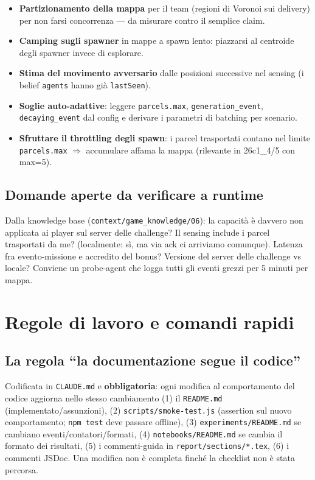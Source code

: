 \documentclass[11pt,a4paper]{article}
\newcommand{\file}[1]{\texttt{#1}}
\newcommand{\code}[1]{\texttt{#1}}
\begin{document}
\begin{itemize}
  \item \textbf{Partizionamento della mappa} per il team (regioni di
    Voronoi sui delivery) per non farsi concorrenza — da misurare contro
    il semplice claim.
  \item \textbf{Camping sugli spawner} in mappe a spawn lento: piazzarsi
    al centroide degli spawner invece di esplorare.
  \item \textbf{Stima del movimento avversario} dalle posizioni
    successive nel sensing (i belief \code{agents} hanno già
    \code{lastSeen}).
  \item \textbf{Soglie auto-adattive}: leggere \code{parcels.max},
    \code{generation\_event}, \code{decaying\_event} dal config e derivare
    i parametri di batching per scenario.
  \item \textbf{Sfruttare il throttling degli spawn}: i parcel trasportati
    contano nel limite \code{parcels.max} $\Rightarrow$ accumulare affama
    la mappa (rilevante in 26c1\_4/5 con max=5).
\end{itemize}

\subsection{Domande aperte da verificare a runtime}

Dalla knowledge base (\file{context/game\_knowledge/06}): la capacità è
davvero non applicata ai player sul server delle challenge? Il sensing
include i parcel trasportati da me? (localmente: sì, ma via ack ci
arriviamo comunque). Latenza fra evento-missione e accredito del bonus?
Versione del server delle challenge vs locale? Conviene un probe-agent che
logga tutti gli eventi grezzi per 5 minuti per mappa.

\section{Regole di lavoro e comandi rapidi}

\subsection{La regola ``la documentazione segue il codice''}

Codificata in \file{CLAUDE.md} e \textbf{obbligatoria}: ogni modifica al
comportamento del codice aggiorna nello stesso cambiamento (1) il
\file{README.md} (implementato/assunzioni), (2) \file{scripts/smoke-test.js}
(assertion sul nuovo comportamento; \code{npm test} deve passare offline),
(3) \file{experiments/README.md} se cambiano eventi/contatori/formati,
(4) \file{notebooks/README.md} se cambia il formato dei risultati,
(5) i commenti-guida in \file{report/sections/*.tex}, (6) i commenti JSDoc.
Una modifica non è completa finché la checklist non è stata percorsa.
\end{document}
